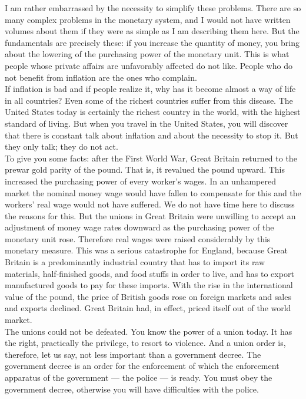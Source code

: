\documentclass[a4paper]{article}
\begin{document}
I am rather embarrassed by the necessity to simplify these problems. There are 
so many complex problems in the monetary system, and I would not have written 
volumes about them if they were as simple as I am describing them here. But the
fundamentals are precisely these: if you increase the quantity of money, you 
bring about the lowering of the purchasing power of the monetary unit. This is 
what people whose private affairs are unfavorably affected do not like. People 
who do not benefit from inflation are the ones who complain.\\

If inflation is bad and if people realize it, why has it become almost a way of
life in all countries? Even some of the richest countries suffer from this 
disease. The United States today is certainly the richest country in the world,
with the highest standard of living. But when you travel in the United States, 
you will discover that there is constant talk about inflation and about the 
necessity to stop it. But they only talk; they do not act.\\

To give you some facts: after the First World War, Great Britain returned to 
the prewar gold parity of the pound. That is, it revalued the pound upward. 
This increased the purchasing power of every worker's wages. In an unhampered 
market the nominal money wage would have fallen to compensate for this and the 
workers' real wage would not have suffered. We do not have time here to discuss
the reasons for this. But the unions in Great Britain were unwilling to accept 
an adjustment of money wage rates downward as the purchasing power of the 
monetary unit rose. Therefore real wages were raised considerably by this 
monetary measure. This was a serious catastrophe for England, because Great 
Britain is a predominantly industrial country that has to import its raw 
materials, half-finished goods, and food stuffs in order to live, and has to 
export manufactured goods to pay for these imports. With the rise in the 
international value of the pound, the price of British goods rose on foreign 
markets and sales and exports declined. Great Britain had, in effect, priced 
itself out of the world market.\\

The unions could not be defeated. You know the power of a union today. It has 
the right, practically the privilege, to resort to violence. And a union order 
is, therefore, let us say, not less important than a government decree. The 
government decree is an order for the enforcement of which the enforcement 
apparatus of the government — the police — is ready. You must obey the 
government decree, otherwise you will have difficulties with the police.\\
\end{document}
